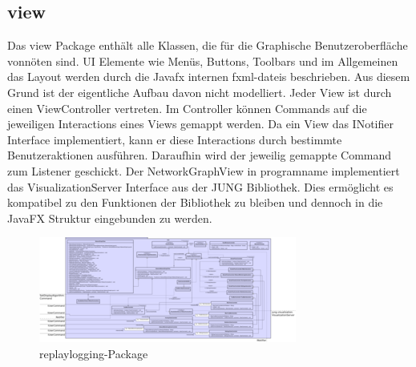 \subsection{view}
\label{subsec:view}

Das view Package enthält alle Klassen, die für die Graphische Benutzeroberfläche vonnöten sind. UI Elemente wie Menüs, Buttons, Toolbars und im Allgemeinen das Layout werden durch die Javafx internen \glspl{fxml-datei} beschrieben. Aus diesem Grund ist der eigentliche Aufbau davon nicht modelliert.
Jeder View ist durch einen ViewController vertreten. Im Controller können Commands auf die jeweiligen Interactions eines Views gemappt werden. Da ein View das INotifier Interface implementiert, kann er diese Interactions durch bestimmte Benutzeraktionen ausführen. Daraufhin wird der jeweilig gemappte Command zum Listener geschickt.
Der NetworkGraphView in \gls{programname} implementiert das VisualizationServer Interface aus der JUNG Bibliothek. Dies ermöglicht es kompatibel zu den Funktionen der Bibliothek zu bleiben und dennoch in die JavaFX Struktur eingebunden zu werden.


\clearpage
\begin{figure}
  \centering
  \includegraphics[width=\textwidth]{../diagramimages/view.png}
  \caption{replaylogging-Package}
\end{figure}
\clearpage
